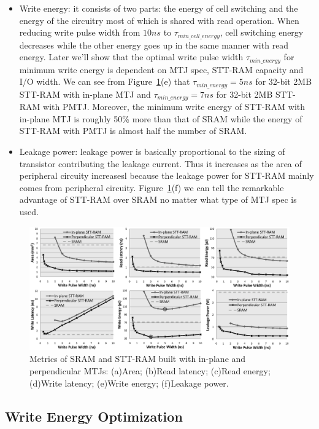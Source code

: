 \begin{itemize}
\item Write energy: it consists of two parts: the energy of cell switching and the energy of the circuitry most of which is shared with read operation. When reducing write pulse width from $10ns$ to $\tau_{min\_cell\_energy}$, cell switching energy decreases while the other energy goes up in the same manner with read energy. Later we'll show that the optimal write pulse width $\tau_{min\_energy}$ for minimum write energy is dependent on MTJ spec, STT-RAM capacity and I/O width. We can see from Figure~\ref{fig:metrics}(e) that $\tau_{min\_energy} = 5ns$ for 32-bit 2MB STT-RAM with in-plane MTJ and $\tau_{min\_energy}= 7ns$ for 32-bit 2MB STT-RAM with PMTJ. Moreover, the minimum write energy of STT-RAM with in-plane MTJ is roughly 50\% more than that of SRAM while the energy of STT-RAM with PMTJ is almost half the number of SRAM.
\item Leakage power: leakage power is basically proportional to the sizing of transistor contributing the leakage current. Thus it increases as the area of peripheral circuity increasesl because the leakage power for STT-RAM mainly comes from peripheral circuity. Figure~\ref{fig:metrics}(f) we can tell the remarkable advantage of STT-RAM over SRAM no matter what type of MTJ spec is used.
\end{itemize}


\begin{figure}[t]
  \centering
  \includegraphics[width=7in]{fig/AllMetrics.eps}
  \caption{Metrics of SRAM and STT-RAM built with in-plane and perpendicular MTJs: (a)Area; (b)Read latency; (c)Read energy; (d)Write latency; (e)Write energy; (f)Leakage power.}
  \label{fig:metrics}
\end{figure}

\subsection{Write Energy Optimization}

